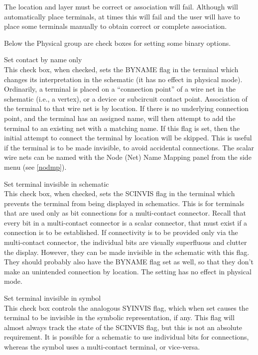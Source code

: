 The location and layer must be correct or association will fail. 
Although {\Xic} will automatically place terminals, at times this will
fail and the user will have to place some terminals manually to obtain
correct or complete association.

Below the {\cb Physical} group are check boxes for setting some binary
options.

\begin{description}
\item{\cb Set contact by name only}\\
This check box, when checked, sets the {\et BYNAME} flag in the
terminal which changes its interpretation in the schematic (it has no
effect in physical mode).  Ordinarily, a terminal is placed on a
``connection point'' of a wire net in the schematic (i.e., a vertex),
or a device or subcircuit contact point.  Association of the terminal
to that wire net is by location.  If there is no underlying connection
point, and the terminal has an assigned name, {\Xic} will then attempt
to add the terminal to an existing net with a matching name.  If this
flag is set, then the initial attempt to connect the terminal by
location will be skipped.  This is useful if the terminal is to be
made invisible, to avoid accidental connections.  The scalar wire nets
can be named with the {\cb Node (Net) Name Mapping} panel from the
side menu (see \ref{nodmp}).

\item{\cb Set terminal invisible in schematic}\\
This check box, when checked, sets the {\et SCINVIS} flag in the
terminal which prevents the terminal from being displayed in
schematics.  This is for terminals that are used only as bit
connections for a multi-contact connector.  Recall that every bit in a
multi-contact connector is a scalar connector, that must exist if a
connection is to be established.  If connectivity is to be provided
only via the multi-contact connector, the individual bits are visually
superfluous and clutter the display.  However, they can be made
invisible in the schematic with this flag.  They should probably also
have the {\et BYNAME} flag set as well, so that they don't make an
unintended connection by location.  The setting has no effect in
physical mode.

\item{\cb Set terminal invisible in symbol}\\
This check box controls the analogous {\et SYINVIS} flag, which when
set causes the terminal to be invisible in the symbolic
representation, if any.  This flag will almost always track the state
of the {\et SCINVIS} flag, but this is not an absolute requirement. 
It is possible for a schematic to use individual bits for connections,
whereas the symbol uses a multi-contact terminal, or vice-versa.
\end{description}

